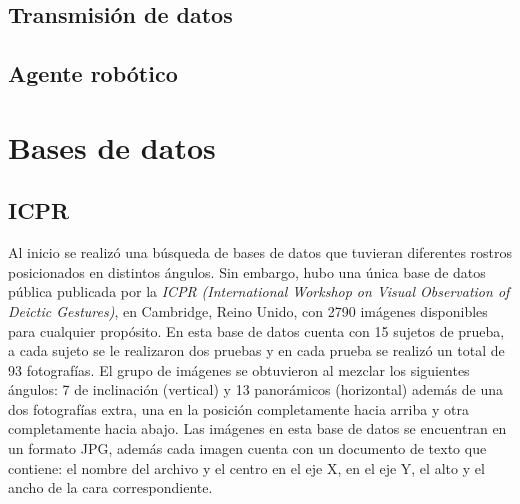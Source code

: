 \section{Transmisión de datos}
\section{Agente robótico}

\chapter{Bases de datos}
\section{ICPR}

Al inicio se realizó una búsqueda de bases de datos que tuvieran diferentes rostros posicionados en distintos ángulos. Sin embargo, hubo una única base de datos pública publicada por la \textit{ICPR} \textit{(International Workshop on Visual Observation of Deictic Gestures)}, en Cambridge, Reino Unido, con  2790 imágenes disponibles para cualquier propósito. En esta base de datos cuenta con 15 sujetos de prueba, a cada sujeto se le realizaron dos pruebas y en cada prueba se realizó un total de 93 fotografías. El grupo de imágenes se obtuvieron al mezclar los siguientes ángulos: 7 de inclinación (vertical) y 13 panorámicos (horizontal) además de una dos fotografías extra, una en la posición completamente hacia arriba y otra completamente hacia abajo. Las imágenes en esta base de datos se encuentran en un formato JPG, además cada imagen cuenta con un documento de texto que contiene: el nombre del archivo y el centro en el eje X, en el eje Y, el alto y el ancho de la cara correspondiente. \cite{Gourier_Hall_Crowley}

